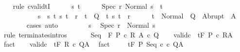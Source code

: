 \begin{isabellebody}
\ \ \isamarkupfalse%
\ {\isacharparenleft}rule\ cvalidtI{\isacharparenright}\isanewline
\ \ \ \ \isamarkupfalse%
\ s\ t\isanewline
\ \ \ \ \isamarkupfalse%
\ {\isachardoublequoteopen}{\isasymGamma}{\isasymturnstile}{\isasymlangle}Spec\ r\ {\isacharcomma}Normal\ s{\isasymrangle}\ {\isasymRightarrow}\ t{\isachardoublequoteclose}\ \isanewline
\ \ \ \ \ \ \ \ \ \ \ {\isachardoublequoteopen}s\ {\isasymin}\ {\isacharbraceleft}s{\isachardot}\ {\isacharparenleft}{\isasymforall}t{\isachardot}\ {\isacharparenleft}s{\isacharcomma}\ t{\isacharparenright}\ {\isasymin}\ r\ {\isasymlongrightarrow}\ t\ {\isasymin}\ Q{\isacharparenright}\ {\isasymand}\ {\isacharparenleft}{\isasymexists}t{\isachardot}\ {\isacharparenleft}s{\isacharcomma}\ t{\isacharparenright}\ {\isasymin}\ r{\isacharparenright}{\isacharbraceright}{\isachardoublequoteclose}\isanewline
\ \ \ \ \isamarkupfalse%
\ {\isachardoublequoteopen}t\ {\isasymin}\ Normal\ {\isacharbackquote}\ Q\ {\isasymunion}\ Abrupt\ {\isacharbackquote}\ A{\isachardoublequoteclose}\isanewline
\ \ \ \ \ \ \isamarkupfalse%
\ cases\ auto\isanewline
\ \ \isamarkupfalse%
\isanewline
\ \ \ \ \isamarkupfalse%
\ s\ \isamarkupfalse%
\ {\isachardoublequoteopen}{\isasymGamma}{\isasymturnstile}Spec\ r\ {\isasymdown}\ Normal\ s{\isachardoublequoteclose}\isanewline
\ \ \ \ \ \ \isamarkupfalse%
\ {\isacharparenleft}rule\ terminates{\isachardot}intros{\isacharparenright}\isanewline
\ \ \isamarkupfalse%
\isanewline
{}\isamarkupfalse%
\isanewline
\ \ \isamarkupfalse%
\ {\isacharparenleft}Seq\ {\isasymTheta}\ F\ P\ c{}\ R\ A\ c{}\ Q{\isacharparenright}\isanewline
\ \ \isamarkupfalse%
\ valid{\isacharunderscore}c{}{\isacharcolon}\ {\isachardoublequoteopen}{\isasymGamma}{\isacharcomma}{\isasymTheta}\ {\isasymTurnstile}\isactrlsub t\isactrlbsub {\isacharslash}F\isactrlesub \ P\ c{}\ R{\isacharcomma}A{\isachardoublequoteclose}\ \isamarkupfalse%
\ fact\isanewline
\ \ \isamarkupfalse%
\ valid{\isacharunderscore}c{}{\isacharcolon}\ {\isachardoublequoteopen}{\isasymGamma}{\isacharcomma}{\isasymTheta}\ {\isasymTurnstile}\isactrlsub t\isactrlbsub {\isacharslash}F\isactrlesub \ R\ c{}\ Q{\isacharcomma}A{\isachardoublequoteclose}\ \isamarkupfalse%
\ fact\isanewline
\ \ \isamarkupfalse%
\ {\isachardoublequoteopen}{\isasymGamma}{\isacharcomma}{\isasymTheta}\ {\isasymTurnstile}\isactrlsub t\isactrlbsub {\isacharslash}F\isactrlesub \ P\ Seq\ c{}\ c{}\ Q{\isacharcomma}A{\isachardoublequoteclose}\isanewline

\end{isabellebody}
